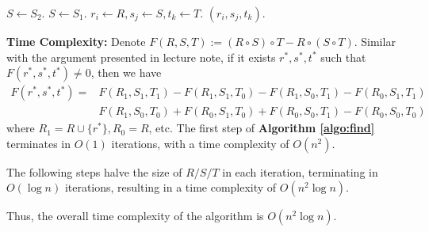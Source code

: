 \begin{answer}
\begin{enumerate}[label=\alph*).]
\begin{algo}
\begin{algorithmic}[1]
						\State $S \leftarrow S_2$.
					\Else
						\State $S \leftarrow S_1$.
					\EndIf
				\EndWhile
				\State $r_i \leftarrow R, s_j \leftarrow S, t_k \leftarrow T$. 
				\State \Return $(r_i, s_j, t_k)$.
			\end{algorithmic}
		\end{algo}
		\textbf{Time Complexity:} Denote $F(R, S, T) := (R\circ S)\circ T - R\circ(S\circ T)$. 
		Similar with the argument presented in lecture note, if it exists $r^*, s^*, t^*$ such that $F(r^*, s^*, t^*)\neq 0$, then 
		we have 
		\begin{align*}
			F(r^*, s^*, t^*) = &F(R_1, S_1, T_1) - F(R_1, S_1, T_0) - F(R_1, S_0, T_1)  - F(R_0, S_1, T_1) \\
			& F(R_1, S_0, T_0) + F(R_0, S_1, T_0) + F(R_0, S_0, T_1) - F(R_0, S_0, T_0) 
		\end{align*}
		where $R_1 = R \cup \{r^*\}, R_0 = R$, etc. The first step of \textbf{Algorithm \ref{algo:find}} terminates in $O(1)$ iterations, with a time complexity of $O(n^2)$. 

		The following steps halve the size of $R/S/T$ in each iteration, terminating in $O(\log n)$ iterations, resulting in a time complexity of $O(n^2\log n)$. 
		
		Thus, the overall time complexity of the algorithm is $O(n^2\log n)$.
	\end{enumerate}
	\ed
\end{answer}